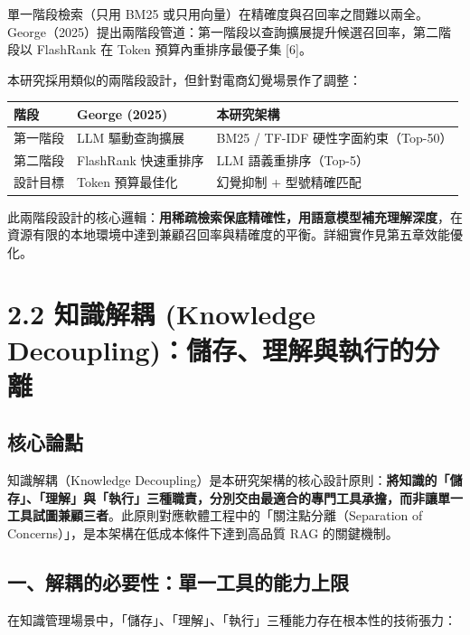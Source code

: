 單一階段檢索（只用 BM25
或只用向量）在精確度與召回率之間難以兩全。George（2025）提出兩階段管道：第一階段以查詢擴展提升候選召回率，第二階段以
FlashRank 在 Token 預算內重排序最優子集 {[}6{]}。

本研究採用類似的兩階段設計，但針對電商幻覺場景作了調整：

{\def\LTcaptype{none} %
\begin{longtable}[]{@{}lll@{}}
\toprule\noalign{}
階段 & George (2025) & 本研究架構 \\
\midrule\noalign{}
\endhead
\bottomrule\noalign{}
\endlastfoot
第一階段 & LLM 驅動查詢擴展 & BM25 / TF-IDF 硬性字面約束（Top-50） \\
第二階段 & FlashRank 快速重排序 & LLM 語義重排序（Top-5） \\
設計目標 & Token 預算最佳化 & 幻覺抑制 + 型號精確匹配 \\
\end{longtable}
}

此兩階段設計的核心邏輯：\textbf{用稀疏檢索保底精確性，用語意模型補充理解深度}，在資源有限的本地環境中達到兼顧召回率與精確度的平衡。詳細實作見第五章效能優化。

\chapter{2.2 知識解耦 (Knowledge
Decoupling)：儲存、理解與執行的分離}\label{ux77e5ux8b58ux89e3ux8026-knowledge-decouplingux5132ux5b58ux7406ux89e3ux8207ux57f7ux884cux7684ux5206ux96e2}

\section{核心論點}\label{ux6838ux5fc3ux8ad6ux9ede}

知識解耦（Knowledge
Decoupling）是本研究架構的核心設計原則：\textbf{將知識的「儲存」、「理解」與「執行」三種職責，分別交由最適合的專門工具承擔，而非讓單一工具試圖兼顧三者}。此原則對應軟體工程中的「關注點分離（Separation
of Concerns）」，是本架構在低成本條件下達到高品質 RAG 的關鍵機制。

\section{一、解耦的必要性：單一工具的能力上限}\label{ux4e00ux89e3ux8026ux7684ux5fc5ux8981ux6027ux55aeux4e00ux5de5ux5177ux7684ux80fdux529bux4e0aux9650}

在知識管理場景中，「儲存」、「理解」、「執行」三種能力存在根本性的技術張力：

